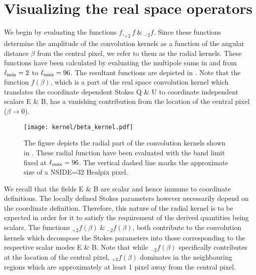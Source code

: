 
 
\section{Visualizing the real space operators} \label{sec:visualize_operator}
We begin by evaluating the functions $f, _{+2}f ~\&~ _{-2}f $. Since these functions determine the amplitude of the convolution kernels as a function of the angular distance $\beta$ from the central pixel, we refer to them as the radial kernels. These functions have been calculated by evaluating the multipole sums in  and  from $\ell_{\rm min}=2$ to $\ell_{\rm max}=96$. The resultant functions are depicted in . Note that the function $f(\beta)$, which is a part of the  real space convolution  kernel which translates the coordinate dependent Stokes Q \& U to coordinate independent scalars E \& B, has a vanishing contribution from the location of the central pixel ($\beta \rightarrow 0$). 
%
\begin{figure}[!hbt]
\centering
\texttt{[image: kernel/beta\_kernel.pdf]}
\caption{The figure depicts the radial part of the convolution kernels shown in . These radial function have been evaluated with the band limit fixed at $\ell_{\rm max}=96$. The vertical dashed line marks the approximate size of a NSIDE=32 Healpix pixel.}
\label{fig:beta_kernel}
\end{figure}
%
We recall that the fields E \& B are scalar and hence immune to coordinate definitions. The locally defined Stokes parameters however necessarily depend on the coordinate definition. Therefore, this nature of the radial kernel is to be expected in order for it to satisfy the requirement of the derived quantities being scalars. The functions $_{+2}f(\beta)~\&~_{-2}f(\beta)$, both contribute to the convolution kernels which decompose the Stokes parameters into those corresponding to the respective scalar modes E \& B. Note that while $_{-2}f(\beta)$ specifically contributes at the location of the central pixel, $_{+2}f(\beta)$ dominates in the neighbouring regions which are approximately at least 1 pixel away from the central pixel.


